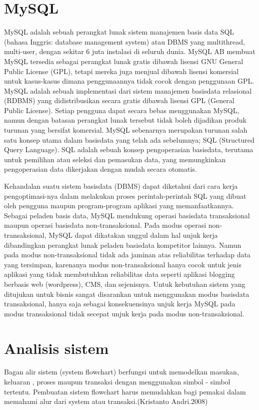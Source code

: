 \documentclass{jtetiproposalskripsi}
\begin{document}
\section{MySQL}
MySQL adalah sebuah perangkat lunak sistem manajemen basis data SQL (bahasa Inggris: database management system) atau DBMS yang multithread, multi-user, dengan sekitar 6 juta instalasi di seluruh dunia. MySQL AB membuat MySQL tersedia sebagai perangkat lunak gratis dibawah lisensi GNU General Public License (GPL), tetapi mereka juga menjual dibawah lisensi komersial untuk kasus-kasus dimana penggunaannya tidak cocok dengan penggunaan GPL.\\
MySQL adalah sebuah implementasi dari sistem manajemen basisdata relasional (RDBMS) yang didistribusikan secara gratis dibawah lisensi GPL (General Public License). Setiap pengguna dapat secara bebas menggunakan MySQL, namun dengan batasan perangkat lunak tersebut tidak boleh dijadikan produk turunan yang bersifat komersial. MySQL sebenarnya merupakan turunan salah satu konsep utama dalam basisdata yang telah ada sebelumnya; SQL (Structured Query Language). SQL adalah sebuah konsep pengoperasian basisdata, terutama untuk pemilihan atau seleksi dan pemasukan data, yang memungkinkan pengoperasian data dikerjakan dengan mudah secara otomatis.

Kehandalan suatu sistem basisdata (DBMS) dapat diketahui dari cara kerja pengoptimasi-nya dalam melakukan proses perintah-perintah SQL yang dibuat oleh pengguna maupun program-program aplikasi yang memanfaatkannya. Sebagai peladen basis data, MySQL mendukung operasi basisdata transaksional maupun operasi basisdata non-transaksional. Pada modus operasi non-transaksional, MySQL dapat dikatakan unggul dalam hal unjuk kerja dibandingkan perangkat lunak peladen basisdata kompetitor lainnya. Namun pada modus non-transaksional tidak ada jaminan atas reliabilitas terhadap data yang tersimpan, karenanya modus non-transaksional hanya cocok untuk jenis aplikasi yang tidak membutuhkan reliabilitas data seperti aplikasi blogging berbasis web (wordpress), CMS, dan sejenisnya. Untuk kebutuhan sistem yang ditujukan untuk bisnis sangat disarankan untuk menggunakan modus basisdata transaksional, hanya saja sebagai konsekuensinya unjuk kerja MySQL pada modus transaksional tidak secepat unjuk kerja pada modus non-transaksional.
\section{Analisis sistem}
Bagan alir sistem (system flowchart) berfungsi untuk memodelkan masukan, keluaran , proses maupun transaksi dengan menggunakan simbol - simbol tertentu. Pembuatan sistem flowchart harus memudahkan bagi pemakai dalam memahami alur dari system atau transaksi.(Kristanto Andri.2008) 
\end{document}
